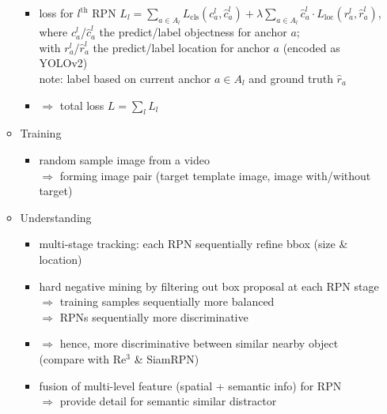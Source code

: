 \begin{itemize}
\begin{itemize}
		\begin{itemize}
		\item loss for $l^\text{th}$ RPN $\displaystyle L_l = \sum_{a\in A_{l}}L_\text{cls}(c^l_a, \hat c^l_a) + \lambda \sum_{a\in A_l} \hat c^l_a \cdot L_\text{loc}(r_a^l, \hat r_a^l)$, \\
		where $c^l_a$/$\hat c^l_a$ the predict/label objectness for anchor $a$; \\
		with  $r_a^l$/$\hat r_a^l$ the predict/label location for anchor $a$ (encoded as YOLOv2) \\
		note: label based on current anchor $a\in A_l$ and ground truth $\hat r_a$
		\item $\Rightarrow$ total loss $\displaystyle L = \sum_{l} L_l$
		\end{itemize}	
	\item Training
		\begin{itemize}
		\item random sample image from a video \\
		$\Rightarrow$ forming image pair (target template image, image with/without target)
		\end{itemize}
	\item Understanding
		\begin{itemize}
		\item multi-stage tracking: each RPN sequentially refine bbox (size \& location)
		\item hard negative mining by filtering out box proposal at each RPN stage \\
		$\Rightarrow$ training samples sequentially more balanced \\
		$\Rightarrow$ RPNs sequentially more discriminative
		\item $\Rightarrow$ hence, more discriminative between similar nearby object \\
		(compare with Re$^3$ \& SiamRPN)
		\item fusion of multi-level feature (spatial + semantic info) for RPN \\
		$\Rightarrow$ provide detail for semantic similar distractor
		\end{itemize}
	\end{itemize}


\end{itemize}
